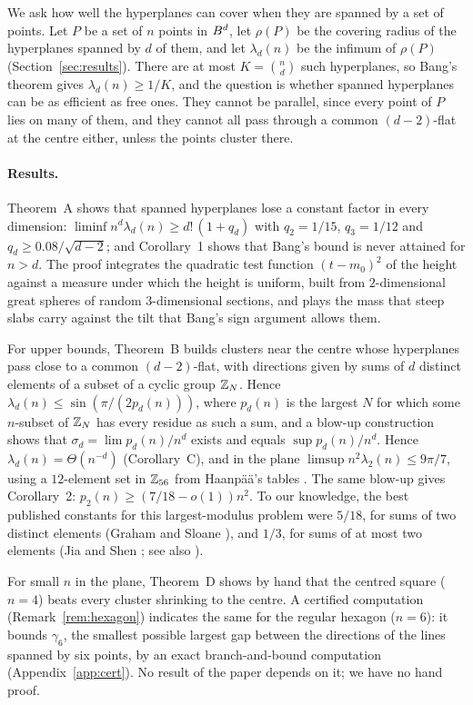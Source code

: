 \documentclass[11pt]{article}
\begin{document}
We ask how well the hyperplanes can cover when they are spanned by a set of points. Let $P$ be a set of $n$
points in $B^d$, let $\rho(P)$ be the covering radius of the hyperplanes spanned by $d$ of them, and let
$\lambda_d(n)$ be the infimum of $\rho(P)$ (Section~\ref{sec:results}). There are at most $K=\binom nd$ such
hyperplanes, so Bang's theorem gives $\lambda_d(n)\ge1/K$, and the question is whether spanned hyperplanes can be as
efficient as free ones. They cannot be parallel, since every point of $P$ lies on many of them, and they cannot all
pass through a common $(d-2)$-flat at the centre either, unless the points cluster there.

\paragraph{Results.} Theorem~A shows that spanned hyperplanes lose a constant factor in every dimension:
$\liminf n^d\lambda_d(n)\ge d!\,(1+q_d)$ with $q_2=1/15$, $q_3=1/12$ and $q_d\ge0.08/\sqrt{d-2}$; and
Corollary~1 shows that Bang's bound is never attained for $n>d$. The proof integrates the quadratic test function
$(t-m_0)^2$ of the height against a measure under which the height is uniform, built from $2$-dimensional great spheres
of random $3$-dimensional sections, and plays the mass that steep slabs carry against the tilt that Bang's sign
argument allows them.

For upper bounds, Theorem~B builds clusters near the centre whose hyperplanes pass close to a common
$(d-2)$-flat, with directions given by sums of $d$ distinct elements of a subset of a cyclic group $\mathbb{Z}_N$. Hence
$\lambda_d(n)\le\sin(\pi/(2p_d(n)))$, where $p_d(n)$ is the largest $N$ for which some $n$-subset of $\mathbb{Z}_N$ has every
residue as such a sum, and a blow-up construction shows that $\sigma_d=\lim p_d(n)/n^d$ exists and equals
$\sup p_d(n)/n^d$. Hence $\lambda_d(n)=\Theta(n^{-d})$ (Corollary~C), and in the plane
$\limsup n^2\lambda_2(n)\le9\pi/7$, using a $12$-element set in $\mathbb{Z}_{56}$ from Haanp\"a\"a's tables \cite{Haanpaa}.
The same blow-up gives Corollary~2: $p_2(n)\ge(7/18-o(1))n^2$. To our knowledge, the best published constants for
this largest-modulus problem were $5/18$, for sums of two distinct elements (Graham and Sloane \cite{GS}), and
$1/3$, for sums of at most two elements (Jia and Shen \cite{JS}; see also \cite[Section~B.1]{Bajnok}).

For small $n$ in the plane, Theorem~D shows by hand that the centred square ($n=4$) beats every cluster shrinking
to the centre. A certified computation (Remark~\ref{rem:hexagon}) indicates the same for the regular hexagon ($n=6$): it
bounds $\gamma_6$, the smallest possible largest gap between the directions of the lines spanned by six points, by an
exact branch-and-bound computation (Appendix~\ref{app:cert}). No result of the paper depends on it; we have no hand
proof.
\end{document}
